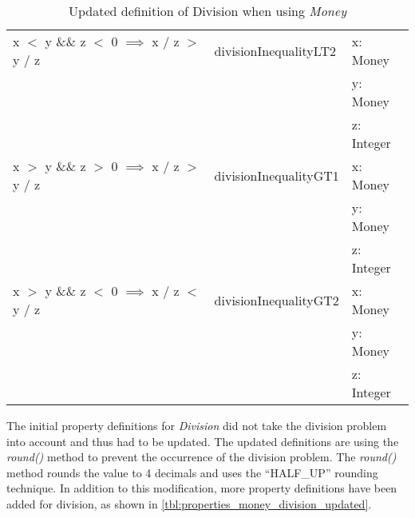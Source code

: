 \begin{table}[!ht]
\begin{tabular}{lll}
\rowcolor[HTML]{EFEFEF} x $<$ y \&\& z $<$ 0 $\implies$ x / z $>$ y / z              & divisionInequalityLT2  & x: Money                 \\
\rowcolor[HTML]{EFEFEF}                                                              &                        & y: Money                 \\
\rowcolor[HTML]{EFEFEF}                                                              &                        & z: Integer               \\
												x $>$ y \&\& z $>$ 0 $\implies$ x / z $>$ y / z              & divisionInequalityGT1  & x: Money                 \\
                                                                                     &                        & y: Money                 \\
                                                                                     &                        & z: Integer               \\
\rowcolor[HTML]{EFEFEF} x $>$ y \&\& z $<$ 0 $\implies$ x / z $<$ y / z              & divisionInequalityGT2  & x: Money                 \\
\rowcolor[HTML]{EFEFEF}                                                              &                        & y: Money                 \\
\rowcolor[HTML]{EFEFEF}                                                              &                        & z: Integer               \\ \hline
\end{tabular}
\caption{Updated definition of Division when using \textit{Money}}
\label{tbl:properties_money_division_updated}
\end{table}
\FloatBarrier\noindent
The initial property definitions for \textit{Division} did not take the division
problem into account and thus had to be updated. The updated definitions are
using the \textit{round()} method to prevent the occurrence of the division
problem. The \textit{round()} method rounds the value to 4 decimals and uses the
``HALF\_UP'' rounding technique. In addition to this modification, more property
definitions have been added for division, as shown in
\autoref{tbl:properties_money_division_updated}.

